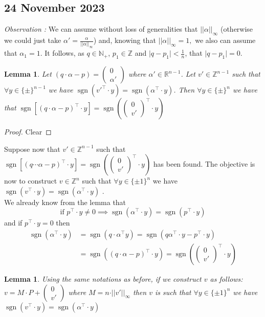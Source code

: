\documentclass[a4paper,11pt,american]{article}
\newcommand{\N}{\mathbb{N}}
\newcommand{\R}{\mathbb{R}}
\newcommand{\Z}{\mathbb{Z}}
\newcommand{\norm}[1]{\vert\vert#1\vert\vert}
\DeclareMathOperator{\sign}{sgn}
\theoremstyle{plain}
\newtheorem{lemma}[theorem]{Lemma}
\theoremstyle{definition}
\begin{document}
\subsection*{24 November 2023}
\emph{Observation :} We can assume without loss of generalities that $\norm{\alpha}_{\infty}$ (otherwise we could just take $\alpha'=\frac{\alpha}{\norm{\alpha}_{\infty}}$) and, knowing that $\norm{\alpha}_{\infty}=1,$ we also can assume that $\alpha_1=1$. It follows, as $q\in\N_+$, $p_1\in\Z$ and $\vert q-p_1\vert<\frac{1}{n}$, that $\vert q-p_1\vert=0$.\\
\begin{lemma}
    Let $(q\cdot \alpha-p)=\begin{pmatrix}
        0\\
        \alpha'
    \end{pmatrix}$ where $\alpha'\in\R^{n-1}$. Let $v'\in\Z^{n-1}$ such that $\forall y\in\{\pm\}^{n-1}$ we have $\sign(v'^\top\cdot y)=\sign(\alpha^\top\cdot y)$. Then $\forall y\in\{\pm\}^n$ we have that $\sign[(q\cdot\alpha-p)^\top\cdot y]=\sign(\begin{pmatrix}
        0\\
        v'
    \end{pmatrix}^\top\cdot y)$
\end{lemma}
\begin{proof}
    Clear
\end{proof}
Suppose now that $v'\in\Z^{n-1}$ such that $\sign[(q\cdots\alpha-p)^\top\cdot y]=\sign(\begin{pmatrix}
        0\\
        v'
    \end{pmatrix}^\top\cdot y)$ has been found. The objective is now to construct $v\in\Z^n$ such that $\forall y\in\{\pm1\}^{n}$ we have $\sign(v^\top\cdot y)=\sign(\alpha^\top\cdot y)$ .\\
    We already know from the lemma that $$ \text{if } p^\top\cdot y\neq 0\implies\sign(\alpha^\top\cdot y)=\sign(p^\top\cdot y)$$ and if $ p^\top\cdot y=0$ then \begin{align*}
        \sign(\alpha^\top \cdot y)&=\sign(q\cdot \alpha^\top y)=\sign(q\alpha^\top\cdot y-p^\top\cdot y)\\
        &=\sign((q\cdot\alpha-p)^\top\cdot y)=\sign(\begin{pmatrix}
        0\\
        v'
    \end{pmatrix}^\top\cdot y)
    \end{align*}
    \begin{lemma}
        Using the same notations as before, if we construct $v$ as follows: $v=M\cdot P+\begin{pmatrix}
        0\\
        v'
    \end{pmatrix}$ where $M=n\cdot\norm{v'}_{\infty}$ then $v$ is such that $\forall y\in\{\pm1\}^{n}$ we have $\sign(v^\top\cdot y)=\sign(\alpha^\top\cdot y)$
    \end{lemma}
\end{document}
